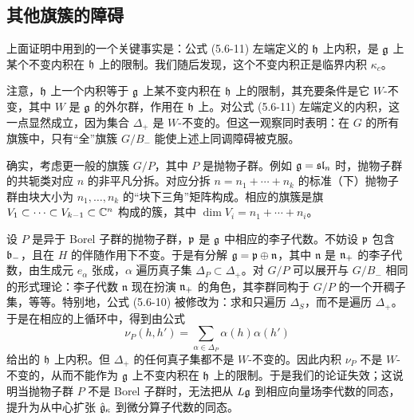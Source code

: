 
\subsection{其他旗簇的障碍}

上面证明中用到的一个关键事实是：公式 (5.6-11) 左端定义的 $\mathfrak{h}$ 上内积，是 $\mathfrak{g}$ 上某个不变内积在 $\mathfrak{h}$ 上的限制。我们随后发现，这个不变内积正是临界内积 $\kappa_c$。

注意，$\mathfrak{h}$ 上一个内积等于 $\mathfrak{g}$ 上某不变内积在 $\mathfrak{h}$ 上的限制，其充要条件是它 $W$-不变，其中 $W$ 是 $\mathfrak{g}$ 的外尔群，作用在 $\mathfrak{h}$ 上。对公式 (5.6-11) 左端定义的内积，这一点显然成立，因为集合 $\Delta_+$ 是 $W$-不变的。但这一观察同时表明：在 $G$ 的所有旗簇中，只有“全”旗簇 $G/B_-$ 能使上述上同调障碍被克服。

确实，考虑更一般的旗簇 $G/P$，其中 $P$ 是抛物子群。例如 $\mathfrak{g}=\mathfrak{sl}_n$ 时，抛物子群的共轭类对应 $n$ 的非平凡分拆。对应分拆 $n = n_1+\cdots+n_k$ 的标准（下）抛物子群由块大小为 $n_1,\dots,n_k$ 的“块下三角”矩阵构成。相应的旗簇是旗 $V_1\subset\cdots\subset V_{k-1}\subset\mathbb{C}^n$ 构成的簇，其中 $\dim V_i = n_1+\cdots+n_i$。

设 $P$ 是异于 Borel 子群的抛物子群，$\mathfrak{p}$ 是 $\mathfrak{g}$ 中相应的李子代数。不妨设 $\mathfrak{p}$ 包含 $\mathfrak{b}_-$，且在 $H$ 的伴随作用下不变。于是有分解 $\mathfrak{g} = \mathfrak{p}\oplus\mathfrak{n}$，其中 $\mathfrak{n}$ 是 $\mathfrak{n}_+$ 的李子代数，由生成元 $e_\alpha$ 张成，$\alpha$ 遍历真子集 $\Delta_P\subset\Delta_+$。对 $G/P$ 可以展开与 $G/B_-$ 相同的形式理论：李子代数 $\mathfrak{n}$ 现在扮演 $\mathfrak{n}_+$ 的角色，其李群同构于 $G/P$ 的一个开稠子集，等等。特别地，公式 (5.6-10) 被修改为：求和只遍历 $\Delta_S$，而不是遍历 $\Delta_+$。于是在相应的上循环中，得到由公式
\[
\nu_P(h,h') = \sum_{\alpha\in\Delta_P}\alpha(h)\alpha(h')
\]
给出的 $\mathfrak{h}$ 上内积。但 $\Delta_+$ 的任何真子集都不是 $W$-不变的。因此内积 $\nu_P$ 不是 $W$-不变的，从而不能作为 $\mathfrak{g}$ 上不变内积在 $\mathfrak{h}$ 上的限制。于是我们的论证失效；这说明当抛物子群 $P$ 不是 Borel 子群时，无法把从 $L\mathfrak{g}$ 到相应向量场李代数的同态，提升为从中心扩张 $\hat{\mathfrak{g}}_\kappa$ 到微分算子代数的同态。

